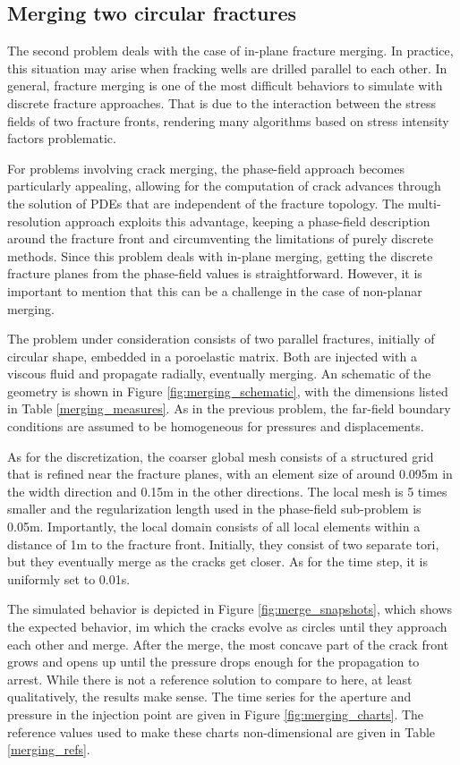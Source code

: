 \FloatBarrier

\subsection{Merging two circular fractures}

The second problem deals with the case of in-plane fracture merging. In practice, this situation may arise when fracking wells are drilled parallel to each other.  In general, fracture merging is one of the most difficult behaviors to simulate with discrete fracture approaches. That is due to the interaction between the stress fields of two fracture fronts, rendering many algorithms based on stress intensity factors problematic. 

For problems involving crack merging, the phase-field approach becomes particularly appealing, allowing for the computation of crack advances through the solution of PDEs that are independent of the fracture topology.  The multi-resolution approach exploits this advantage, keeping a phase-field description around the fracture front and circumventing the limitations of purely discrete methods.  Since this problem deals with in-plane merging, getting the discrete fracture planes from the phase-field values is straightforward. However, it is important to mention that this can be a challenge in the case of non-planar merging.

The problem under consideration consists of two parallel fractures, initially of circular shape, embedded in a poroelastic matrix. Both are injected with a viscous fluid and propagate radially, eventually merging. An schematic of the geometry is shown in Figure \ref{fig:merging_schematic}, with the dimensions listed in Table \ref{merging_measures}. As in the previous problem, the far-field boundary conditions are assumed to be homogeneous for pressures and displacements. 

As for the discretization, the coarser global mesh consists of a structured grid that is refined near the fracture planes, with an element size of around 0.095m in the width direction and 0.15m in the other directions. The local mesh is 5 times smaller and the regularization length used in the phase-field sub-problem is 0.05m. Importantly, the local domain consists of all local elements within a distance of 1m to the fracture front. Initially, they consist of two separate tori, but they eventually merge as the cracks get closer. As for the time step, it is uniformly set to 0.01s.

The simulated behavior is depicted in Figure \ref{fig:merge_snapshots}, which shows the expected behavior, im which the cracks evolve as circles until they approach each other and merge. After the merge, the most concave part of the crack front grows and opens up until the pressure drops enough for the propagation to arrest. While there is not a reference solution to compare to here, at least qualitatively, the results make sense.  The time series for the aperture and pressure in the injection point are given in Figure \ref{fig:merging_charts}. The reference values used to make these charts non-dimensional are given in Table \ref{merging_refs}.

